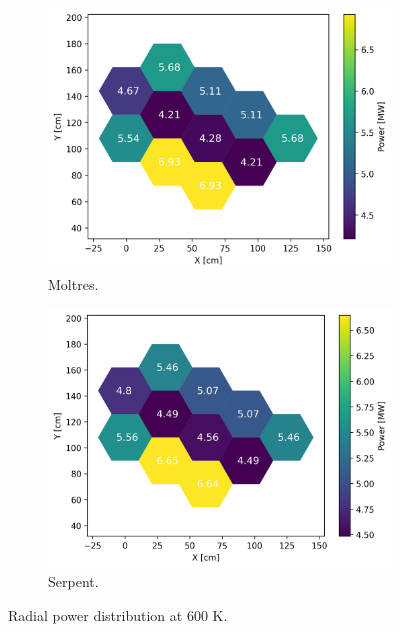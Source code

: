 \documentclass[11pt,letterpaper]{article}
\begin{document}
\begin{figure}[htbp!]
	\centering
	\begin{subfigure}[t]{0.4\textwidth}
		\centering
		\includegraphics[width=\linewidth]{figures-fullcore/3D-fullcore-600-15Gd-power}
		\caption{Moltres.}
	\end{subfigure}
	\begin{subfigure}[t]{0.4\textwidth}
		\centering
		\includegraphics[width=\linewidth]{figures-fullcore/serpent26G-600-power}
		\caption{Serpent.}
	\end{subfigure}
	\hfill
	\caption{Radial power distribution at 600 K.}
	\label{fig:fullcore-600-power}
\end{figure}
\end{document}
